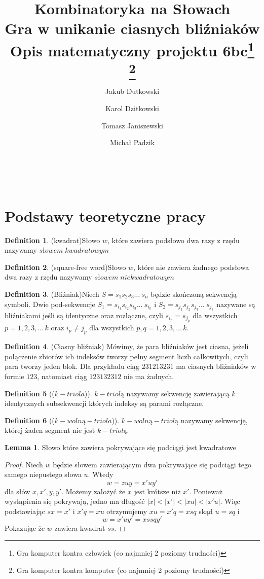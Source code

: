 \documentclass[11pt,a4paper]{article}
\author{Jakub Dutkowski}
\author{Karol Dzitkowski}
\author{Tomasz Janiszewski}
\author{Michał Padzik}
\affil{Wydział Matematyki i Nauk Informacyjnych, Politechnika Warszawska}
\title{
	Kombinatoryka na Słowach\\
	Gra w unikanie ciasnych bliźniaków\\
	Opis matematyczny projektu
	6bc\footnote{Gra komputer kontra człowiek (co najmniej 2 poziomy trudności)}
\footnote{Gra komputer kontra komputer (co najmniej 2 poziomy trudności)}
 }
\theoremstyle{definition}
\newtheorem{definition}{Definition}[section]
\newtheorem{lemma}{Lemma}[section]
\begin{document}
\maketitle\
\newpage\

\section{Podstawy teoretyczne pracy}
\begin{definition}{(kwadrat)}\label{def:sqr-word}
Słowo $w$, które zawiera podsłowo dwa razy z rzędu
nazywamy $słowem\;kwadratowym$
\end{definition}
\begin{definition}{(square-free word)}\label{def:sqr-free-word}
Słowo $w$, które nie zawiera żadnego podsłowa dwa razy z rzędu
nazywamy $słowem\;niekwadratowym$
\end{definition}
\begin{definition}{(Bliźniak)}\label{def:blizniak}
Niech $S = s_1 s_2 s_3 \ldots\ s_n$ będzie skończoną sekwencją symboli. Dwie pod-sekwencje
$S_1 = s_{i_1} s_{i_2} s_{i_3} \ldots\ s_{i_k}$ i $S_2 = s_{j_1} s_{j_2} s_{j_3} \ldots\ s_{j_k}$
nazywane są bliźniakami jeśli są identyczne oraz rozłączne, czyli $s_{i_p} = s_{j_p}$ dla
wszystkich $p = {1, 2, 3, \ldots\, k}$ oraz $ i_p \neq j_p $ dla wszystkich $ p,q = {1, 2, 3, \ldots\, k}$.
\end{definition}
\begin{definition}{(Ciasny bliźniak)}
Mówimy, że para bliźniaków jest ciasna, jeżeli połączenie zbiorów ich indeksów tworzy pełny segment
liczb całkowitych, czyli para tworzy jeden blok. Dla przykładu ciąg $231213231$ ma ciasnych bliźniaków
w formie $123$, natomiast ciąg $123132312$ nie ma żadnych.
\end{definition}
\begin{definition}[($k-triola$)]\label{def:triola}
$k-triolą$ nazywamy sekwencję zawierającą $k$ identycznych subsekwencji
których indeksy są parami rozłączne.
\end{definition}
\begin{definition}[($k-wolną-triola$)]\label{def:triola}
$k-wolną-triolą$ nazywamy sekwencję, której żaden segment
nie jest $k-triolą$.
\end{definition}

\begin{lemma}\label{lemat:1}
Słowo które zawiera pokrywające się podciągi jest kwadratowe
\begin{proof}
Niech $w$ będzie słowem zawierającym dwa pokrywające się podciągi tego
samego niepustego słowa $u$.
Wtedy $$w = zuy = x'uy'$$ dla słów $x,x',y,y'$. Możemy założyć że $x$
jest krótsze niż $x'$. Ponieważ wystąpienia się pokrywają,
jedno ma długość $|x| < |x'| < |xu| < |x'u|$. Więc podstawiając
$sx = x'$ i $x'q = xu$ otrzymujemy $xu = x'q = xsq$
skąd $u =  sq$ i $$w = x'uy' = xssqy' $$
Pokazując że $w$ zawiera kwadrat $ss$.
\end{proof}
\end{lemma}
\end{document}
